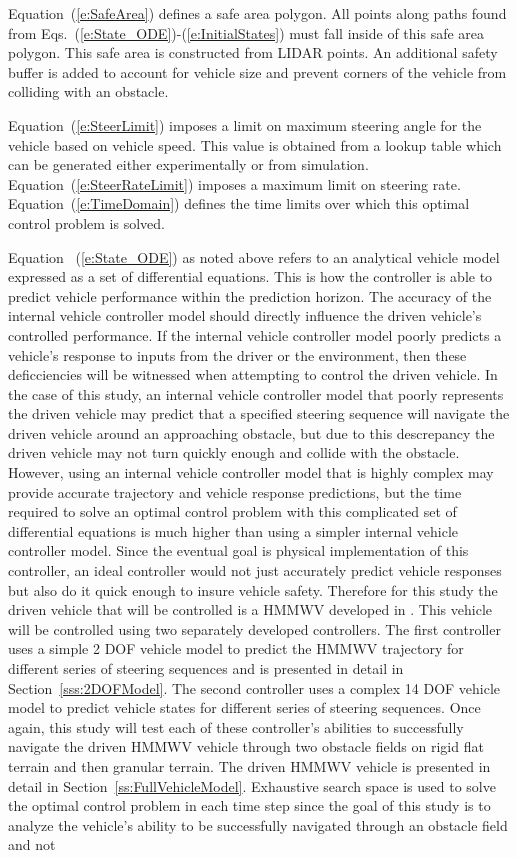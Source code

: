 \documentclass[12pt,twocolumn]{article}
\newcommand{\CHRONO}{{\sffamily{{Chrono}}}}
\begin{document}
Equation~(\ref{e:SafeArea}) defines a safe area polygon. All points along paths found from Eqs.~(\ref{e:State_ODE})-(\ref{e:InitialStates}) must fall inside of this safe area polygon. This safe area is constructed from LIDAR points. An additional safety buffer is added to account for vehicle size and prevent corners of the vehicle from colliding with an obstacle. 

Equation~(\ref{e:SteerLimit}) imposes a limit on maximum steering angle for the vehicle based on vehicle speed. This value is obtained from a lookup table which can be generated either experimentally or from simulation. Equation~(\ref{e:SteerRateLimit}) imposes a maximum limit on steering rate. Equation~(\ref{e:TimeDomain}) defines the time limits over which this optimal control problem is solved.

Equation ~(\ref{e:State_ODE}) as noted above refers to an analytical vehicle model expressed as a set of differential equations. This is how the controller is able to predict vehicle performance within the prediction horizon. The accuracy of the internal vehicle controller model should directly influence the driven vehicle's controlled performance. If the internal vehicle controller model poorly predicts a vehicle's response to inputs from the driver or the environment, then these deficciencies will be witnessed when attempting to control the driven vehicle. In the case of this study, an internal vehicle controller model that poorly represents the driven vehicle may predict that a specified steering sequence will navigate the driven vehicle around an approaching obstacle, but due to this descrepancy the driven vehicle may not turn quickly enough and collide with the obstacle. However, using an internal vehicle controller model that is highly complex may provide accurate trajectory and vehicle response predictions, but the time required to solve an optimal control problem with this complicated set of differential equations is much higher than using a simpler internal vehicle controller model. Since the eventual goal is physical implementation of this controller, an ideal controller would not just accurately predict vehicle responses but also do it quick enough to insure vehicle safety. Therefore for this study the driven vehicle that will be controlled is a HMMWV developed in {\CHRONO}.  This vehicle will be controlled using two separately developed controllers. The first controller uses a simple 2 DOF vehicle model to predict the {\CHRONO}  HMMWV trajectory for different series of steering sequences and is presented in detail in Section~\ref{sss:2DOFModel}. The second controller uses a complex 14 DOF vehicle model to predict vehicle states for different series of steering sequences. Once again, this study will test each of these controller's abilities to successfully navigate the driven {\CHRONO}  HMMWV vehicle through two obstacle fields on rigid flat terrain and then granular terrain. The driven {\CHRONO} HMMWV vehicle is presented in detail in Section~\ref{ss:FullVehicleModel}. Exhaustive search space is used to solve the optimal control problem in each time step since the goal of this study is to analyze the vehicle's ability to be successfully navigated through an obstacle field and not 
\end{document}

